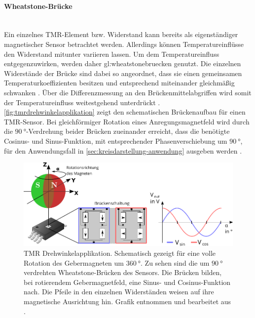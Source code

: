 \clearpage

\paragraph{Wheatstone-Brücke}\label{par:wheatstone-bruecke}$~$\\


Ein einzelnes TMR-Element bzw. Widerstand kann bereits als eigenständiger magnetischer Sensor betrachtet werden. Allerdings können Temperatureinflüsse den Widerstand mitunter variieren lassen. Um dem Temperatureinfluss entgegenzuwirken, werden daher \gls{gl:wheatstonebruecken} genutzt. Die einzelnen Widerstände der Brücke sind dabei so angeordnet, dass sie einen gemeinsamen Temperaturkoeffizienten besitzen und entsprechend miteinander gleichmäßig schwanken \cite{Tille2020}. Über die Differenzmessung an den Brückenmittelabgriffen wird somit der Temperatureinfluss weitestgehend unterdrückt \cite{TDK2016}\cite{Tille2020}. \autoref{fig:tmrdrehwinkelapplikation} zeigt den schematischen Brückenaufbau für einen TMR-Sensor. Bei gleichförmiger Rotation eines Anregungsmagnetfeld wird durch die $\SI{90}{\degree}$-Verdrehung beider Brücken zueinander erreicht, dass die benötigte Cosinus- und Sinus-Funktion, mit entsprechender Phasenverschiebung um $\SI{90}{\degree}$, für den Anwendungsfall in \autoref{sec:kreisdarstellung-anwendung} ausgeben werden \cite{TDK2016}. 


\vspace{5mm}
\begin{figure}[tbph]
	\centering
	\includegraphics[width=\linewidth]{chapters/images/2-Grundlagen/TMR_Drehwinkelapplikation}
	\caption[TMR Drehwinkelapplikation]{TMR Drehwinkelapplikation. Schematisch gezeigt für eine volle Rotation des 
		Gebermagneten um $\SI{360}{\degree}$. Zu sehen sind die um $\SI{90}{\degree}$ verdrehten Wheatstone-Brücken des 
		Sensors. Die Brücken bilden, bei rotierendem Gebermagnetfeld, eine Sinus- und Cosinus-Funktion nach. Die Pfeile in 
		den einzelnen Widerständen weisen auf ihre magnetische Ausrichtung hin. Grafik entnommen und bearbeitet aus 
		\cite{Schuethe2020a}.}
	\label{fig:tmrdrehwinkelapplikation}
\end{figure}
